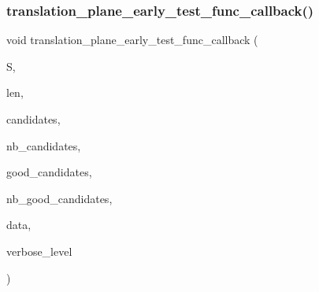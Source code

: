 \mbox{\label{translation__plane2_8_c_a4c252150015dcf1e634fed722b6766be}} 
\subsubsection{\texorpdfstring{translation\+\_\+plane\+\_\+early\+\_\+test\+\_\+func\+\_\+callback()}{translation\_plane\_early\_test\_func\_callback()}}
{\footnotesize\ttfamily void translation\+\_\+plane\+\_\+early\+\_\+test\+\_\+func\+\_\+callback (\begin{DoxyParamCaption}\item[{\mbox{\hyperlink{galois_8h_a09fddde158a3a20bd2dcadb609de11dc}{I\+NT}} $\ast$}]{S,  }\item[{\mbox{\hyperlink{galois_8h_a09fddde158a3a20bd2dcadb609de11dc}{I\+NT}}}]{len,  }\item[{\mbox{\hyperlink{galois_8h_a09fddde158a3a20bd2dcadb609de11dc}{I\+NT}} $\ast$}]{candidates,  }\item[{\mbox{\hyperlink{galois_8h_a09fddde158a3a20bd2dcadb609de11dc}{I\+NT}}}]{nb\+\_\+candidates,  }\item[{\mbox{\hyperlink{galois_8h_a09fddde158a3a20bd2dcadb609de11dc}{I\+NT}} $\ast$}]{good\+\_\+candidates,  }\item[{\mbox{\hyperlink{galois_8h_a09fddde158a3a20bd2dcadb609de11dc}{I\+NT}} \&}]{nb\+\_\+good\+\_\+candidates,  }\item[{void $\ast$}]{data,  }\item[{\mbox{\hyperlink{galois_8h_a09fddde158a3a20bd2dcadb609de11dc}{I\+NT}}}]{verbose\+\_\+level }\end{DoxyParamCaption})}

